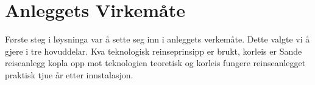 \chapter{Anleggets Virkemåte}
\thispagestyle{fancy}

Første steg i løysninga var å sette seg inn i anleggets verkemåte.
Dette valgte vi å gjere i tre hovuddelar. Kva teknologisk reinseprinsipp er brukt, korleis er Sande reiseanlegg
kopla opp mot teknologien teoretisk og korleis fungere reinseanlegget praktisk tjue år etter innstalasjon.
